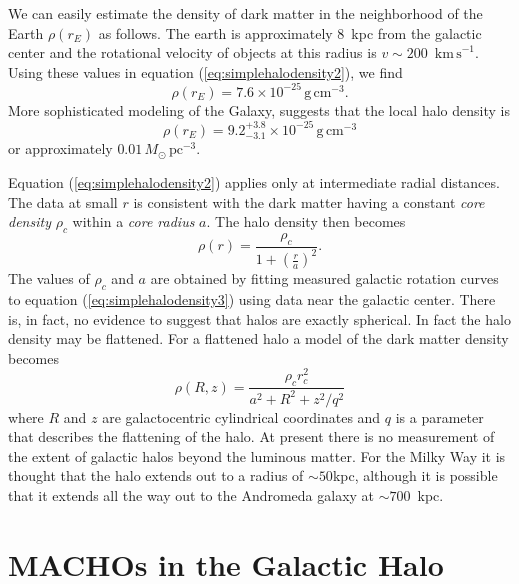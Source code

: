 We can easily estimate the density of dark matter in the neighborhood of the
Earth $\rho(r_E)$ as follows. The earth is approximately $8$~kpc
from the galactic center and the rotational velocity of objects at this radius
is $v\sim 200$~$\mathrm{km\,s}^{-1}$. Using these values in equation
(\ref{eq:simplehalodensity2}), we find
\begin{equation}
\rho(r_E) = 7.6 \times 10^{-25}\, \mathrm{g}\,\mathrm{cm}^{-3}.
\end{equation}
More sophisticated modeling of the
Galaxy\cite{1995ApJ...449L.123G}, suggests that the local halo density is
\begin{equation}
\rho(r_E) = 9.2_{-3.1}^{+3.8} \times 10^{-25}\, \mathrm{g}\,\mathrm{cm}^{-3}
\end{equation}
or approximately $0.01\,M_\odot\,\mathrm{pc}^{-3}$.

Equation (\ref{eq:simplehalodensity2}) applies only at intermediate radial
distances. The data at small $r$ is consistent with the dark matter having a
constant \emph{core density} $\rho_c$ within a \emph{core radius}
$a$\cite{Rix:1996}. The halo density then becomes
\begin{equation}
\rho(r) = \frac{\rho_c}{1 + \left(\frac{r}{a}\right)^2}.
\label{eq:simplehalodensity3}
\end{equation}
The values of $\rho_c$ and $a$ are obtained by fitting measured galactic
rotation curves to equation (\ref{eq:simplehalodensity3}) using data near the
galactic center.  There is, in fact, no evidence to suggest that halos are
exactly spherical. In fact the halo density may be flattened\cite{Rix:1996}. For a
flattened halo a model of the dark matter density becomes
\begin{equation}
\rho(R,z) = \frac{\rho_c r^2_c}{a^2 + R^2 + z^2/q^2}
\label{eq:simplehalodensity4}
\end{equation}
where $R$ and $z$ are galactocentric cylindrical coordinates and $q$ is a
parameter that describes the flattening of the halo. At present there is no
measurement of the extent of galactic halos beyond the luminous matter. For
the Milky Way it is thought that the halo extends out to a radius of $\sim
50$kpc, although it is possible that it extends all the way out to the Andromeda
galaxy at $\sim 700$~kpc.

\section{MACHOs in the Galactic Halo}
\label{s:machos}

